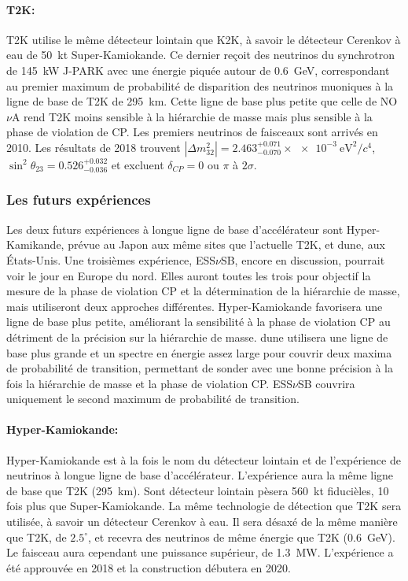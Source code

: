             \paragraph{T2K\cite{Abe2018}:} T2K utilise le même détecteur lointain que K2K, à savoir le détecteur Cerenkov à eau de \SI{50}{\kilo\tonne} Super-Kamiokande. Ce dernier reçoit des neutrinos du synchrotron de \SI{145}{\kilo\watt} J-PARK avec une énergie piquée autour de \SI{0.6}{\giga\electronvolt}, correspondant au premier maximum de probabilité de disparition des neutrinos muoniques à la ligne de base de T2K de \SI{295}{\kilo\meter}. Cette ligne de base plus petite que celle de NO$\nu$A rend T2K moins sensible à la hiérarchie de masse mais plus sensible à la phase de violation de CP. Les premiers neutrinos de faisceaux sont arrivés en 2010. Les résultats de 2018\cite{Abe2018} trouvent $|\Delta m_{32}^2|=2.463^{+0.071}_{-0.070}\times\SI{e-3}{\electronvolt\squared\per c^4}$, $\sin^2{\theta_{23}}=0.526^{+0.032}_{-0.036}$ et excluent $\delta_{CP}=0$ ou $\pi$ à $2\sigma$.
            
            \subsubsection{Les futurs expériences}
            
            Les deux futurs expériences à longue ligne de base d'accélérateur sont Hyper-Kamikande, prévue au Japon aux même sites que l'actuelle T2K, et \gls{dune}, aux États-Unis. Une troisièmes expérience, ESS$\nu$SB, encore en discussion, pourrait voir le jour en Europe du nord.  Elles auront toutes les trois pour objectif la mesure de la phase de violation CP et la détermination de la hiérarchie de masse, mais utiliseront deux approches différentes. Hyper-Kamiokande favorisera une ligne de base plus petite, améliorant la sensibilité à la phase de violation CP au détriment de la précision sur la hiérarchie de masse. \gls{dune} utilisera une ligne de base plus grande et un spectre en énergie assez large pour couvrir deux maxima de probabilité de transition, permettant de sonder avec une bonne précision à la fois la hiérarchie de masse et la phase de violation CP. ESS$\nu$SB couvrira uniquement le second maximum de probabilité de transition.
            
            \paragraph{Hyper-Kamiokande\cite{HK2018}:} Hyper-Kamiokande est à la fois le nom du détecteur lointain et de l'expérience de neutrinos à longue ligne de base d'accélérateur. L'expérience aura la même ligne de base que T2K (\SI{295}{\kilo\meter}). Sont détecteur lointain pèsera \SI{560}{\kilo\tonne} fiducièles, 10 fois plus que Super-Kamiokande. La même technologie de détection que T2K sera utilisée, à savoir un détecteur Cerenkov à eau. Il sera désaxé de la même manière que T2K, de $2.5^{\circ}$, et recevra des neutrinos de même énergie que T2K (\SI{0.6}{\giga\electronvolt}). Le faisceau aura cependant une puissance supérieur, de \SI{1.3}{\mega\watt}. L'expérience a été approuvée en 2018 et la construction débutera en 2020.
            
